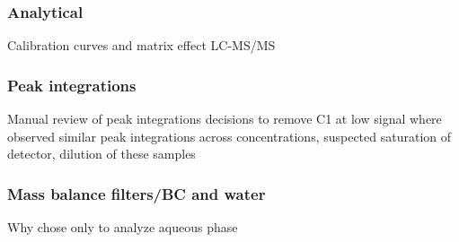 \subsubsection{Analytical}
Calibration curves and matrix effect
LC-MS/MS

\subsubsection{Peak integrations}
Manual review of peak integrations
decisions to remove C1 at low signal
where observed similar peak integrations across concentrations, suspected saturation of detector, dilution of these samples

\subsubsection{Mass balance filters/BC and water}
Why chose only to analyze aqueous phase